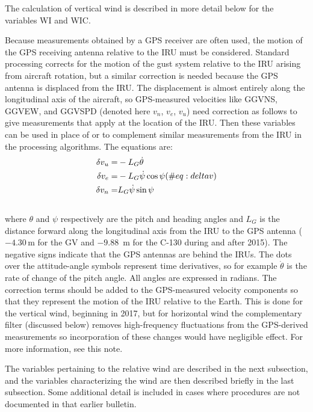 \documentclass[
  english,
]{book}
\begin{document}
The calculation of vertical wind is described in more detail below for
the variables WI and WIC.

Because measurements obtained by a GPS receiver are often used, the
motion of the GPS receiving antenna relative to the IRU must be
considered. Standard processing corrects for the motion of the gust
system relative to the IRU arising from aircraft rotation, but a similar
correction is needed because the GPS antenna is displaced from the IRU.
The displacement is almost entirely along the longitudinal axis of the
aircraft, so GPS-measured velocities like GGVNS, GGVEW, and GGVSPD
(denoted here \(v_n\), \(v_e\), \(v_u\)) need correction as follows to
give measurements that apply at the location of the IRU. Then these
variables can be used in place of or to complement similar measurements
from the IRU in the processing algorithms. The equations are:\\
\begin{align}\begin{split}
\delta v_{u} = & -L_{G}\dot{\theta}\notag \\
\delta v_{e} = & -L_{G}\dot{\psi}\,{\cos\psi}\notag \\
\delta v_{n} = &  L_{G}\dot{\psi}\,{\sin\psi}
\end{split}
(\#eq:deltav)
\end{align}\\
where \(\theta\) and \(\psi\) respectively are the pitch and heading
angles and \(L_G\) is the distance forward along the longitudinal axis
from the IRU to the GPS antenna (\(−4.30\) m for the GV and \(-9.88\)~m
for the C-130 during and after 2015). The negative signs indicate that
the GPS antennas are behind the IRUs. The dots over the attitude-angle
symbols represent time derivatives, so for example \(\dot{\theta}\) is
the rate of change of the pitch angle. All angles are expressed in
radians. The correction terms should be added to the GPS-measured
velocity components so that they represent the motion of the IRU
relative to the Earth. This is done for the vertical wind, beginning in
2017, but for horizontal wind the complementary filter (discussed below)
removes high-frequency fluctuations from the GPS-derived measurements so
incorporation of these changes would have negligible effect. For more
information, see this note.

The variables pertaining to the relative wind are described in the next
subsection, and the variables characterizing the wind are then described
briefly in the last subsection. Some additional detail is included in
cases where procedures are not documented in that earlier bulletin.
\end{document}
